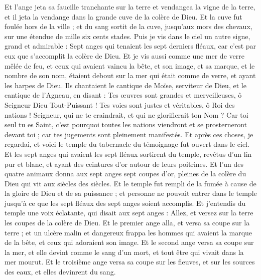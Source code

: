 \begin{multicols}{2}
Et l'ange jeta sa faucille tranchante sur la terre et vendangea la vigne de la terre, et il jeta la vendange dans la grande cuve de la colère de Dieu.
Et la cuve fut foulée hors de la ville ; et du sang sortit de la cuve, jusqu’aux mors des chevaux, sur une étendue de mille six cents stades{}.
\VerseOne{}Puis je vis dans le ciel un autre signe, grand et admirable : Sept anges qui tenaient les sept derniers fléaux, car c'est par eux que s’accomplit la colère de Dieu.
Et je vis aussi comme une mer de verre mêlée de feu, et ceux qui avaient vaincu la bête, et son image, et sa marque, et le nombre de son nom, étaient debout sur la mer qui était comme de verre, et ayant les harpes de Dieu.
Ils chantaient le cantique de Moïse, serviteur de Dieu, et le cantique de l'Agneau, en disant : Tes œuvres sont grandes et merveilleuses, ô Seigneur Dieu Tout-Puissant ! Tes voies sont justes et véritables, ô Roi des nations !
Seigneur, qui ne te craindrait, et qui ne glorifierait ton Nom ? Car toi seul tu es Saint, c'est pourquoi toutes les nations viendront et se prosterneront devant toi ; car tes jugements sont pleinement manifestés.
Et après ces choses, je regardai, et voici le temple du tabernacle du témoignage fut ouvert dans le ciel.
Et les sept anges qui avaient les sept fléaux sortirent du temple, revêtus d'un lin pur et blanc, et ayant des ceintures d’or autour de leurs poitrines.
Et l'un des quatre animaux donna aux sept anges sept coupes d'or, pleines de la colère du Dieu qui vit aux siècles des siècles.
Et le temple fut rempli de la fumée à cause de la gloire de Dieu et de sa puissance ; et personne ne pouvait entrer dans le temple jusqu'à ce que les sept fléaux des sept anges soient accomplis.
\VerseOne{}Et j’entendis du temple une voix éclatante, qui disait aux sept anges : Allez, et versez sur la terre les coupes de la colère de Dieu.
Et le premier ange alla, et versa sa coupe sur la terre ; et un ulcère malin et dangereux frappa les hommes qui avaient la marque de la bête, et ceux qui adoraient son image.
Et le second ange versa sa coupe sur la mer, et elle devint comme le sang d'un mort, et tout être qui vivait dans la mer mourut.
Et le troisième ange versa sa coupe sur les fleuves, et sur les sources des eaux, et elles devinrent du sang.

\end{multicols}
